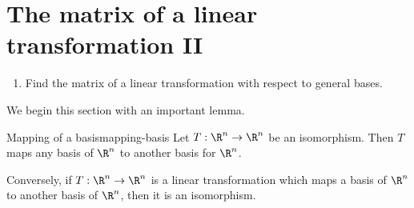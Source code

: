 \section{The matrix of a linear transformation II}


\begin{outcome}
  \begin{enumerate}
  \item Find the matrix of a linear transformation with respect to
    general bases.
  \end{enumerate}
\end{outcome}

We begin this section with an important lemma. 

\begin{lemma}{Mapping of a basis}{mapping-basis}
Let $T: \R^n \to \R^n$ be an isomorphism.  Then $T$ maps any basis of
$\R^n$ to another basis for $\R^n$. 

Conversely, if $T:
\R^n \to \R^n$ is a linear transformation which
maps a basis of $\R^n$ to another basis of $\R^n$,
then it is an isomorphism.
\end{lemma}

